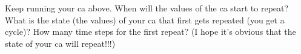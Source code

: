 Keep running your ca above. When will the values of the ca start to repeat? What is the state (the values) of your ca that first gets repeated (you get a cycle)? How many time steps for the first repeat? (I hope it's obvious that the state of your ca will repeat!!!)

